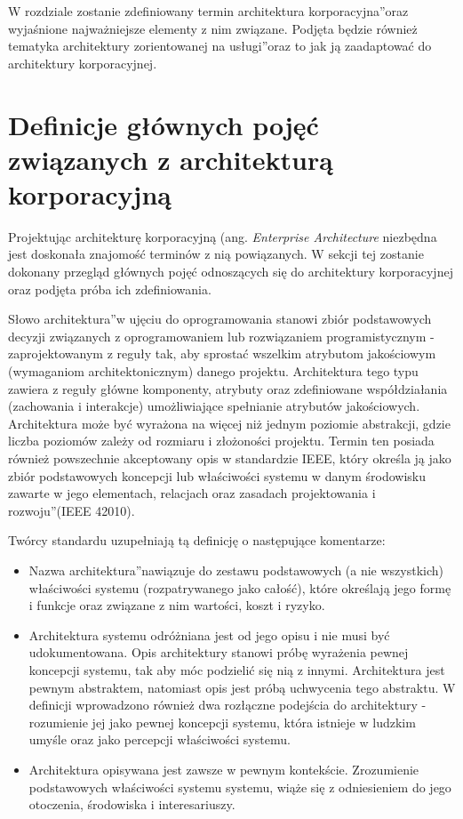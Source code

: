 W rozdziale zostanie zdefiniowany termin \quotedblbase architektura korporacyjna\textquotedblright oraz wyjaśnione najważniejsze elementy z nim związane. Podjęta będzie również tematyka \quotedblbase architektury zorientowanej na usługi\textquotedblright oraz to jak ją zaadaptować do architektury korporacyjnej. 

\section{Definicje głównych pojęć związanych z architekturą korporacyjną}
Projektując architekturę korporacyjną (ang. \textit{Enterprise Architecture} niezbędna jest doskonała znajomość terminów z nią powiązanych. W sekcji tej zostanie dokonany przegląd głównych pojęć odnoszących się do architektury korporacyjnej oraz podjęta próba ich zdefiniowania.

Słowo \quotedblbase architektura\textquotedblright w ujęciu do oprogramowania stanowi zbiór podstawowych decyzji związanych z oprogramowaniem lub rozwiązaniem programistycznym - zaprojektowanym z reguły tak, aby sprostać wszelkim atrybutom jakościowym (wymaganiom architektonicznym) danego projektu. Architektura tego typu zawiera z reguły główne komponenty, atrybuty oraz zdefiniowane współdziałania (zachowania i interakcje) umożliwiające spełnianie atrybutów jakościowych. Architektura może być wyrażona na więcej niż jednym poziomie abstrakcji, gdzie liczba poziomów zależy od rozmiaru i złożoności projektu. Termin ten posiada również powszechnie akceptowany opis w standardzie IEEE, który określa ją jako \quotedblbase zbiór podstawowych koncepcji lub właściwości systemu w danym środowisku zawarte w jego elementach, relacjach oraz zasadach projektowania i rozwoju\textquotedblright (IEEE 42010). \cite{SOAWzorceArch}

Twórcy standardu uzupełniają tą definicję o następujące komentarze: 
\begin{itemize}
\item{Nazwa \quotedblbase architektura\textquotedblright nawiązuje do zestawu podstawowych (a nie wszystkich) właściwości systemu (rozpatrywanego jako całość), które określają jego formę i funkcje oraz związane z nim wartości, koszt i ryzyko.}
\item{Architektura systemu odróżniana jest od jego opisu i nie musi być udokumentowana. Opis architektury stanowi próbę wyrażenia pewnej koncepcji systemu, tak aby móc podzielić się nią z innymi. Architektura jest pewnym abstraktem, natomiast opis jest próbą uchwycenia tego abstraktu.
W definicji wprowadzono również dwa rozłączne podejścia do architektury - rozumienie jej jako pewnej koncepcji systemu, która istnieje w ludzkim  umyśle oraz jako percepcji właściwości systemu.}
\item{Architektura opisywana jest zawsze w pewnym kontekście. Zrozumienie podstawowych właściwości systemu systemu, wiąże się z odniesieniem do jego otoczenia, środowiska i interesariuszy.}
\end{itemize}

